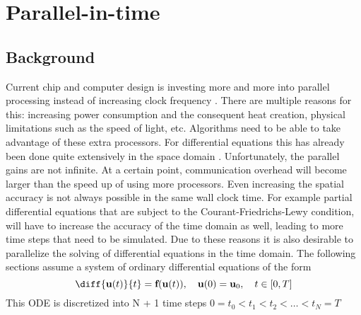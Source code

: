 \section{Parallel-in-time}
\label{sec:intro time para}
\subsection{Background}
\label{subsec:pint background}
Current chip and computer design is investing more and more into parallel processing instead of increasing clock frequency \cite{bautista_intel_nodate}. There are multiple reasons for this: increasing power consumption and the consequent heat creation, physical limitations such as the speed of light, etc. Algorithms need to be able to take advantage of these extra processors. For differential equations this has already been done quite extensively in the space domain \cite{adams_parallel_1999,du_expandable_2020}. Unfortunately, the parallel gains are not infinite. At a certain point, communication overhead will become larger than the speed up of using more processors. Even increasing the spatial accuracy is not always possible in the same wall clock time. For example partial differential equations that are subject to the Courant-Friedrichs-Lewy \cite{courant_uber_1928} condition, will have to increase the accuracy of the time domain as well, leading to more time steps that need to be simulated. Due to these reasons it is also desirable to parallelize the solving of differential equations in the time domain. 
The following sections assume a system of ordinary differential equations of the form 
\[\diff{\textbf{u}(t)}{t} = \textbf{f}(\textbf{u}(t)), \quad \textbf{u}(0) = \textbf{u}_0, \quad t\in[0,T]\]
This ODE is discretized into N + 1 time steps $0 = t_0 < t_1 < t_2 < \hdots < t_{N} = T$
